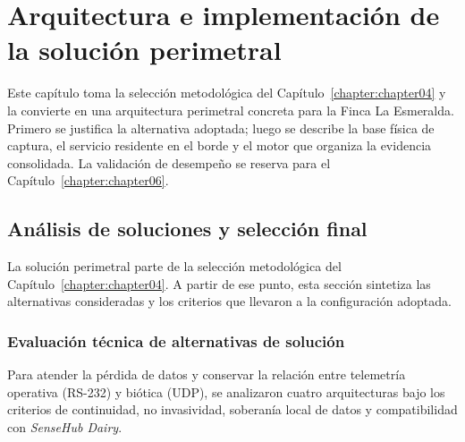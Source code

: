 \chapter{Arquitectura e implementación de la solución perimetral}
\label{chapter:chapter05}

Este capítulo toma la selección metodológica del Capítulo~\ref{chapter:chapter04} y la convierte en una arquitectura perimetral concreta para la Finca La Esmeralda. Primero se justifica la alternativa adoptada; luego se describe la base física de captura, el servicio residente en el borde y el motor que organiza la evidencia consolidada. La validación de desempeño se reserva para el Capítulo~\ref{chapter:chapter06}.

\section{Análisis de soluciones y selección final}
La solución perimetral parte de la selección metodológica del Capítulo~\ref{chapter:chapter04}. A partir de ese punto, esta sección sintetiza las alternativas consideradas y los criterios que llevaron a la configuración adoptada.

\subsection{Evaluación técnica de alternativas de solución}
Para atender la pérdida de datos y conservar la relación entre telemetría operativa (\acs{RS-232}) y biótica (\acs{UDP}), se analizaron cuatro arquitecturas bajo los criterios de continuidad, no invasividad, soberanía local de datos y compatibilidad con \textit{SenseHub Dairy}.

